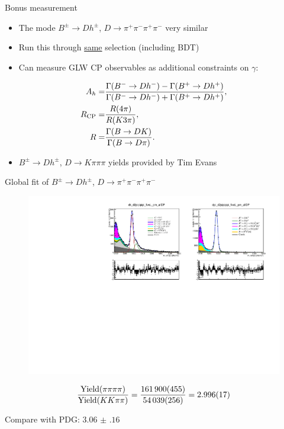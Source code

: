 \documentclass{beamer}
\begin{document}
\begin{frame}{Bonus measurement}
  \begin{itemize}
    \setlength\itemsep{1em}
    \item{The mode $B^\pm\to Dh^\pm$, $D\to\pi^+\pi^-\pi^+\pi^-$ very similar}
    \item{Run this through \underline{same} selection (including BDT)}
    \item{Can measure GLW CP observables as additional constraints on $\gamma$:}
  \end{itemize}
  \begin{align*}
    A_h =& \frac{\Gamma(B^-\to Dh^-) - \Gamma(B^+\to Dh^+)}{\Gamma(B^-\to Dh^-) + \Gamma(B^+\to Dh^+)}, \\
    R_{\rm CP} =& \frac{R(4\pi)}{R(K3\pi)}, \\
    R =& \frac{\Gamma(B\to DK)}{\Gamma(B\to D\pi)}.
  \end{align*}
  \begin{itemize}
    \item{$B^\pm\to Dh^\pm$, $D\to K\pi\pi\pi$ yields provided by Tim Evans}
  \end{itemize}
\end{frame}

\begin{frame}{Global fit of $B^\pm\to Dh^\pm$, $D\to\pi^+\pi^-\pi^+\pi^-$}
  \vspace{-0.3cm}
  \begin{figure}
    \centering
    \includegraphics[width = 1.0\textwidth]{Plots/d2pipipipi_fiveL_allDP.pdf}
  \end{figure}
  \vspace{-0.2cm}
  \begin{equation*}
    \frac{{\rm Yield}(\pi\pi\pi\pi)}{{\rm Yield}(KK\pi\pi)} = \frac{\SI{161900(455)}{}}{\SI{54039(256)}{}} = \SI{2.996(17)}{}
  \end{equation*}
  \begin{center}
    Compare with PDG: $\SI{3.06(16)}{}$
  \end{center}
\end{frame}
\end{document}
